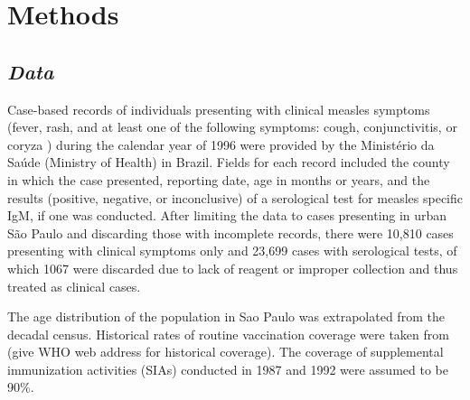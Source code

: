 \section{\texorpdfstring{\textbf{Methods}}{Methods}}\label{methods}

\subsection{\texorpdfstring{\emph{Data}}{Data}}\label{data}

Case-based records of individuals presenting with clinical measles symptoms (fever, rash, and at least one of the following symptoms: cough,
conjunctivitis, or coryza \cite{Hutchins_2004}) during the calendar year of 1996 were provided by the Ministério da Saúde (Ministry of Health) in Brazil. Fields for each record included the county in which the case presented, reporting date, age in months or years, and the results (positive, negative, or inconclusive) of a serological test for measles specific IgM, if one was conducted. After limiting the data to cases presenting in urban S\~{a}o Paulo and discarding those with incomplete records, there were 10,810 cases presenting with clinical symptoms only
and 23,699 cases with serological tests, of which 1067 were discarded due to lack of reagent or improper collection and thus treated as clinical cases.

The age distribution of the population in Sao Paulo was extrapolated from the decadal census. Historical rates of routine vaccination coverage were taken from (give WHO web address for historical coverage). The coverage of supplemental immunization activities (SIAs) conducted in 1987 and 1992 were assumed to be 90\%.